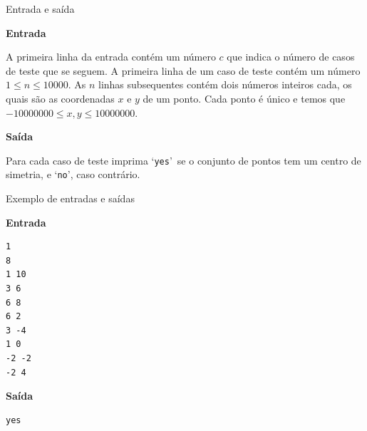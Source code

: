 \begin{frame}[fragile]{Entrada e saída}

\textbf{Entrada}

A primeira linha da entrada contém um número $c$ que indica o número de casos de teste que se
seguem. A primeira linha de um caso de teste contém um número $1 \leq n \leq 10000$. As $n$ linhas
subsequentes contém dois números inteiros cada, os quais são as coordenadas $x$ e $y$ de um ponto.
Cada ponto é único e temos que $-10000000 \leq x, y \leq 10000000$.

\textbf{Saída}

Para cada caso de teste imprima \lq\texttt{yes}\rq\ se o conjunto de pontos tem um centro de 
simetria, e \lq\texttt{no}\rq, caso contrário.

\end{frame}

\begin{frame}[fragile]{Exemplo de entradas e saídas}

\begin{minipage}[t]{0.5\textwidth}
\textbf{Entrada}
\begin{verbatim}
1
8
1 10
3 6
6 8
6 2
3 -4
1 0
-2 -2
-2 4
\end{verbatim}
\end{minipage}
\begin{minipage}[t]{0.45\textwidth}
\textbf{Saída}
\begin{verbatim}
yes
\end{verbatim}
\end{minipage}
\end{frame}

